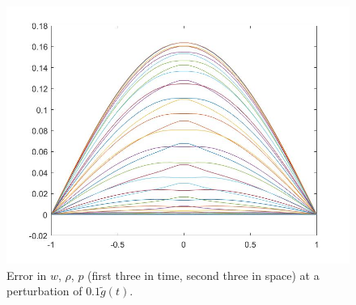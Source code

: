 \documentclass[11pt, a4paper]{article}
\theoremstyle{definition}
\begin{document}
\begin{figure}[h]
	\includegraphics[scale=0.3]{Dexperr6.jpg}
	\caption{Error in $w$, $\rho$, $p$ (first three in time, second three in space) at a perturbation of $0.1 \tilde g(t)$.}
	\label{Dexperr1}
\end{figure}
\end{document}
